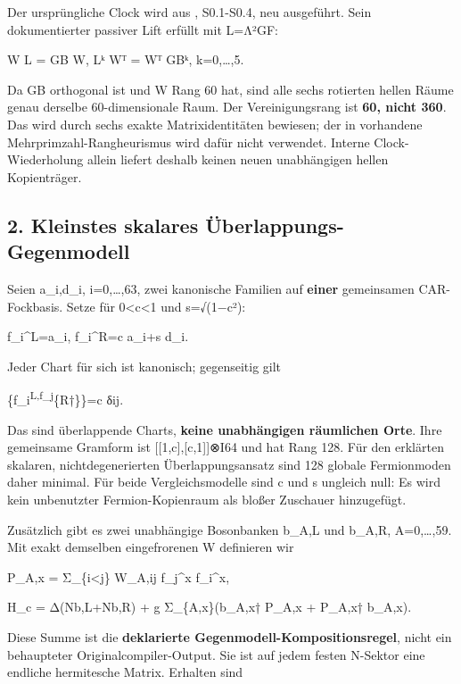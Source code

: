 Der ursprüngliche Clock wird aus
,
S0.1-S0.4, neu ausgeführt. Sein dokumentierter passiver Lift erfüllt mit
L=Λ²GF:

W L = GB W, Lᵏ Wᵀ = Wᵀ GBᵏ, k=0,\ldots,5.

Da GB orthogonal ist und W Rang 60 hat, sind alle sechs rotierten hellen
Räume genau derselbe 60-dimensionale Raum. Der Vereinigungsrang ist
\textbf{60, nicht 360}. Das wird durch sechs exakte Matrixidentitäten
bewiesen; der in  vorhandene
Mehrprimzahl-Rangheurismus wird dafür nicht verwendet. Interne
Clock-Wiederholung allein liefert deshalb keinen neuen unabhängigen
hellen Kopienträger.

\subsection{2. Kleinstes skalares
Überlappungs-Gegenmodell}\label{kleinstes-skalares-uxfcberlappungs-gegenmodell}

Seien a\_i,d\_i, i=0,\ldots,63, zwei kanonische Familien auf
\textbf{einer} gemeinsamen CAR-Fockbasis. Setze für
0\textless c\textless1 und s=√(1−c²):

f\_i\^{}L=a\_i, f\_i\^{}R=c a\_i+s d\_i.

Jeder Chart für sich ist kanonisch; gegenseitig gilt

\{f\_i\textsuperscript{L,f\_j}\{R†\}\}=c δij.

Das sind überlappende Charts, \textbf{keine unabhängigen räumlichen
Orte}. Ihre gemeinsame Gramform ist {[}{[}1,c{]},{[}c,1{]}{]}⊗I64 und
hat Rang 128. Für den erklärten skalaren, nichtdegenerierten
Überlappungsansatz sind 128 globale Fermionmoden daher minimal. Für
beide Vergleichsmodelle sind c und s ungleich null: Es wird kein
unbenutzter Fermion-Kopienraum als bloßer Zuschauer hinzugefügt.

Zusätzlich gibt es zwei unabhängige Bosonbanken b\_A,L und b\_A,R,
A=0,\ldots,59. Mit exakt demselben eingefrorenen W definieren wir

P\_A,x = Σ\_\{i\textless j\} W\_A,ij f\_j\^{}x f\_i\^{}x,

H\_c = Δ(Nb,L+Nb,R) + g Σ\_\{A,x\}(b\_A,x† P\_A,x + P\_A,x† b\_A,x).

Diese Summe ist die \textbf{deklarierte Gegenmodell-Kompositionsregel},
nicht ein behaupteter Originalcompiler-Output. Sie ist auf jedem festen
N-Sektor eine endliche hermitesche Matrix. Erhalten sind

